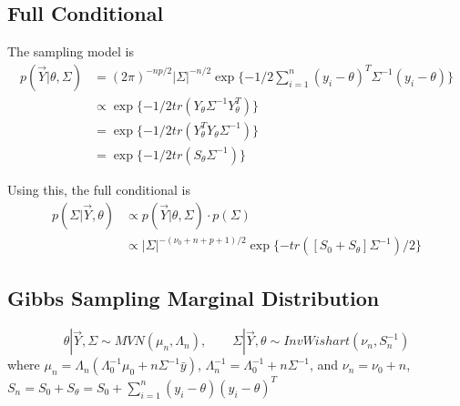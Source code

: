 \subsection*{Full Conditional}
The sampling model is
\begin{align*}
    p(\vec{Y} | \theta, \Sigma) &= (2\pi)^{-np/2}|\Sigma|^{-n/2} \exp\{ -1/2\sum_{i=1}^{n}(y_i - \theta)^T\Sigma^{-1}(y_i - \theta)\} \\
    &\propto \exp \{-1/2tr(Y_\theta\Sigma^{-1}Y_\theta^T)\} \\
    &= \exp \{-1/2tr(Y_\theta^TY_\theta\Sigma^{-1})\} \\
    &= \exp \{-1/2tr(S_\theta\Sigma^{-1})\}
\end{align*}

Using this, the full conditional is
\begin{align*}
    p(\Sigma | \vec{Y}, \theta) &\propto p(\vec{Y} | \theta, \Sigma) \cdot p(\Sigma) \\
    &\propto |\Sigma|^{-(\nu_0 + n + p + 1)/2} \exp\{-tr([S_0 + S_\theta]\Sigma^{-1})/2\}
\end{align*}

\subsection*{Gibbs Sampling Marginal Distribution}
\begin{equation*}
    \theta | \vec{Y}, \Sigma \sim MVN(\mu_n, \Lambda_n), \qquad \Sigma | \vec{Y}, \theta \sim InvWishart(\nu_n, S_n^{-1})
\end{equation*}
where $\mu_n = \Lambda_n (\Lambda_0^{-1}\mu_0 + n\Sigma^{-1}\bar{y})$, $\Lambda_n^{-1} = \Lambda_0^{-1} + n\Sigma^{-1}$, and $\nu_n = \nu_0 + n$, $S_n = S_0 + S_\theta = S_0 + \sum_{i=1}^{n}(y_i - \theta)(y_i - \theta)^T$
